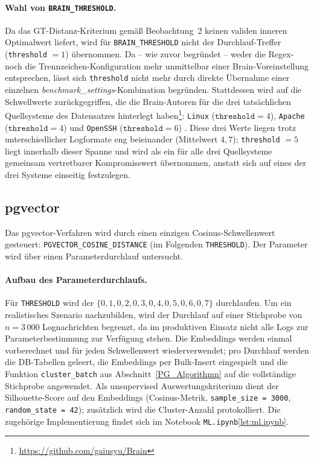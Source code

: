 \paragraph{Wahl von \texttt{BRAIN\_THRESHOLD}.}
Da das GT-Distanz-Kriterium gemäß Beobachtung~2 keinen validen inneren
Optimalwert liefert, wird für \texttt{BRAIN\_THRESHOLD} nicht der
Durchlauf-Treffer (\texttt{threshold} $=1$) übernommen. Da -- wie zuvor begründet
-- weder die Regex- noch die Trennzeichen-Konfiguration mehr unmittelbar
einer Brain-Voreinstellung entsprechen, lässt sich \texttt{threshold} nicht
mehr durch direkte Übernahme einer einzelnen \textit{benchmark\_settings}-Kombination
begründen. Stattdessen wird auf die Schwellwerte zurückgegriffen, die die
Brain-Autoren für die drei tatsächlichen Quellsysteme des Datensatzes
hinterlegt haben\footnote{\url{https://github.com/gaiusyu/Brain}}:
\texttt{Linux} ($\texttt{threshold}=4$), \texttt{Apache} ($\texttt{threshold}=4$)
und \texttt{OpenSSH} ($\texttt{threshold}=6$) \cite{brain}. Diese drei Werte
liegen trotz unterschiedlicher Logformate eng beieinander (Mittelwert
$4{,}7$); \texttt{threshold} $=5$ liegt innerhalb dieser Spanne und wird als
ein für alle drei Quellsysteme gemeinsam vertretbarer Kompromisswert
übernommen, anstatt sich auf eines der drei Systeme einseitig festzulegen.

\subsection{pgvector}
\label{sec:eval:param:pgvector}

Das pgvector-Verfahren wird durch einen einzigen Cosinus-Schwellenwert
gesteuert: \texttt{PGVECTOR\_COSINE\_DISTANCE} (im Folgenden
\texttt{THRESHOLD}). Der Parameter wird über einen Parameterdurchlauf untersucht.

\paragraph{Aufbau des Parameterdurchlaufs.}
Für \texttt{THRESHOLD} wird der
$\{0{,}1, 0{,}2, 0{,}3, 0{,}4, 0{,}5, 0{,}6, 0{,}7\}$ durchlaufen. Um ein
realistisches Szenario nachzubilden, wird der Durchlauf auf einer Stichprobe von
$n = 3\,000$ Lognachrichten begrenzt, da im produktiven Einsatz nicht alle
Logs zur Parameterbestimmung zur Verfügung stehen. Die Embeddings werden
einmal vorberechnet und für jeden Schwellenwert wiederverwendet; pro
Durchlauf werden die DB-Tabellen geleert, die Embeddings per Bulk-Insert
eingespielt und die Funktion \texttt{cluster\_batch} aus
Abschnitt~\ref{PG_Algorithmn} auf die vollständige Stichprobe angewendet.
Als unsupervised Auswertungskriterium dient der Silhouette-Score auf den
Embeddings (Cosinus-Metrik, \texttt{sample\_size = 3000},
\texttt{random\_state = 42}); zusätzlich wird die Cluster-Anzahl
protokolliert. Die zugehörige Implementierung findet sich im Notebook
\texttt{ML.ipynb}\ref{lst:ml.ipynb}.

